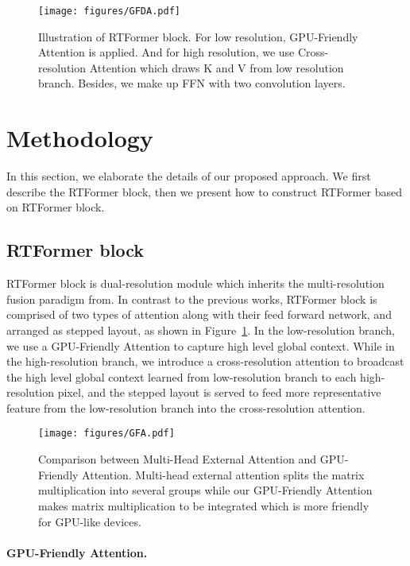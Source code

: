 \documentclass{article}
\begin{document}
\begin{figure}
    \centering
    \texttt{[image: figures/GFDA.pdf]}
    \caption{Illustration of RTFormer block. For low resolution, GPU-Friendly Attention is applied. And for high resolution, we use Cross-resolution Attention which draws K and V from low resolution branch. Besides, we make up FFN with two  convolution layers.}
    \label{fig:GFDA}
\end{figure}


\section{Methodology}
In this section, we elaborate the details of our proposed approach. We first describe the RTFormer block, then we present how to construct RTFormer based on RTFormer block.

\subsection{RTFormer block}


RTFormer block is dual-resolution module which inherits the multi-resolution fusion paradigm from\cite{wang2020deep, hong2021deep, yuan2021hrformer}. In contrast to the previous works, RTFormer block is comprised of two types of attention along with their feed forward network, and arranged as stepped layout, as shown in Figure~\ref{fig:GFDA}. In the low-resolution branch, we use a GPU-Friendly Attention to capture high level global context. While in the high-resolution branch, we introduce a cross-resolution attention to broadcast the high level global context learned from low-resolution branch to each high-resolution pixel, and the stepped layout is served to feed more representative feature from the low-resolution branch into the cross-resolution attention.

\begin{wrapfigure}[25]{r}{7cm}
	\centering
	\texttt{[image: figures/GFA.pdf]}
	\caption{Comparison between Multi-Head External Attention and GPU-Friendly Attention. Multi-head external attention splits the matrix multiplication into several groups while our GPU-Friendly Attention makes matrix multiplication to be integrated which is more friendly for GPU-like devices.}
	\label{fig:GFA}
\end{wrapfigure}


\vspace{-2mm}
\paragraph{GPU-Friendly Attention.}
\end{document}
